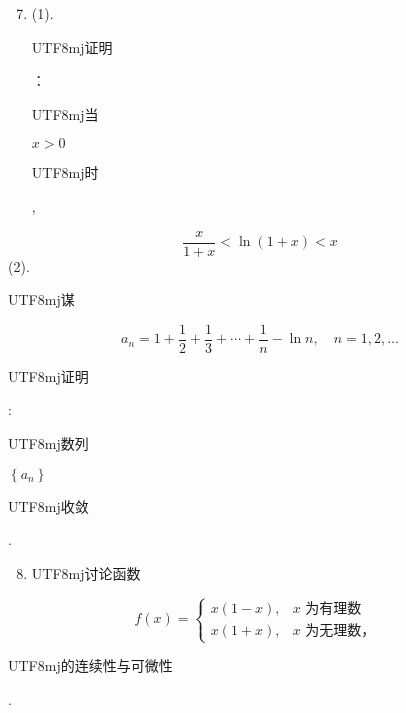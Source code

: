 \documentclass[10pt]{article}
\begin{document}
\begin{enumerate}
  \setcounter{enumi}{6}
  \item (1). \begin{CJK}{UTF8}{mj}证明\end{CJK}：\begin{CJK}{UTF8}{mj}当\end{CJK} $x>0$ \begin{CJK}{UTF8}{mj}时\end{CJK},
\end{enumerate}
$$
\frac{x}{1+x}<\ln (1+x)<x
$$
(2). \begin{CJK}{UTF8}{mj}谋\end{CJK}
$$
a_{n}=1+\frac{1}{2}+\frac{1}{3}+\cdots+\frac{1}{n}-\ln n, \quad n=1,2, \ldots
$$
\begin{CJK}{UTF8}{mj}证明\end{CJK}: \begin{CJK}{UTF8}{mj}数列\end{CJK} $\left\{a_{n}\right\}$ \begin{CJK}{UTF8}{mj}收敛\end{CJK}.

\begin{enumerate}
  \setcounter{enumi}{7}
  \item \begin{CJK}{UTF8}{mj}讨论函数\end{CJK}
\end{enumerate}
$$
f(x)= \begin{cases}x(1-x), & x \text { 为有理数 } \\ x(1+x), & x \text { 为无理数， }\end{cases}
$$
\begin{CJK}{UTF8}{mj}的连续性与可微性\end{CJK}.
\end{document}
